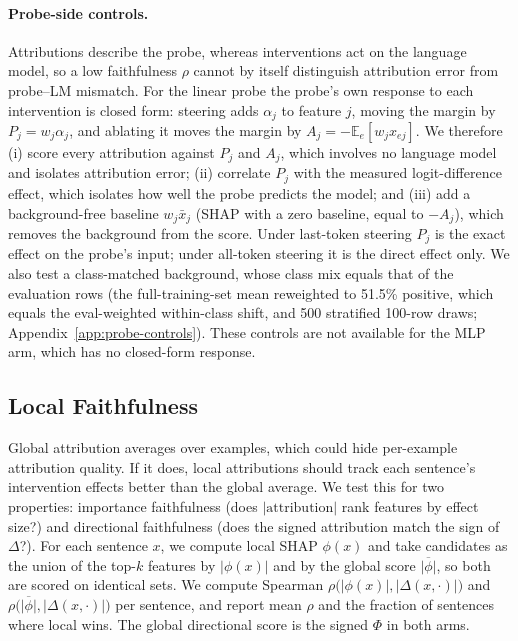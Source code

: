 \paragraph{Probe-side controls.}\label{para:probe-controls} Attributions describe the probe, whereas interventions act on the language model, so a low faithfulness $\rho$ cannot by itself distinguish attribution error from probe--LM mismatch. For the linear probe the probe's own response to each intervention is closed form: steering adds $\alpha_j$ to feature $j$, moving the margin by $P_j=w_j\alpha_j$, and ablating it moves the margin by $A_j=-\mathbb{E}_e[w_j x_{ej}]$. We therefore (i) score every attribution against $P_j$ and $A_j$, which involves no language model and isolates attribution error; (ii) correlate $P_j$ with the measured logit-difference effect, which isolates how well the probe predicts the model; and (iii) add a background-free baseline $w_j\bar{x}_j$ (SHAP with a zero baseline, equal to $-A_j$), which removes the background from the score. Under last-token steering $P_j$ is the exact effect on the probe's input; under all-token steering it is the direct effect only. We also test a class-matched background, whose class mix equals that of the evaluation rows (the full-training-set mean reweighted to 51.5\% positive, which equals the eval-weighted within-class shift, and 500 stratified 100-row draws; Appendix~\ref{app:probe-controls}). These controls are not available for the MLP arm, which has no closed-form response.

\subsection{Local Faithfulness}\label{subsection:local_faithfulness}
Global attribution averages over examples, which could hide per-example attribution quality. If it does, local attributions should track each sentence’s intervention effects better than the global average. We test this for two properties: importance faithfulness (does $|\text{attribution}|$ rank features by effect size?) and directional faithfulness (does the signed attribution match the sign of $\Delta$?). For each sentence $x$, we compute local SHAP $\phi(x)$ and take candidates as the union of the top-$k$ features by $|\phi(x)|$ and by the global score $\overline{|\phi|}$, so both are scored on identical sets. We compute Spearman $\rho\big(|\phi(x)|, |\Delta(x,\cdot)|\big)$ and $\rho\big(\overline{|\phi|}, |\Delta(x,\cdot)|\big)$ per sentence, and report mean $\rho$ and the fraction of sentences where local wins. The global directional score is the signed $\Phi$ in both arms.

